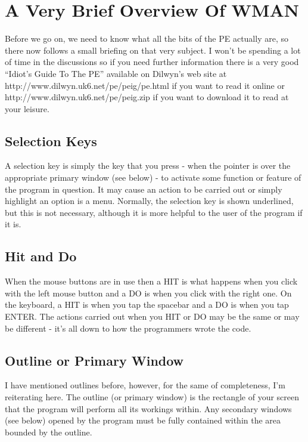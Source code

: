 \section{A Very Brief Overview Of WMAN}
\label{ch22-overview}%

Before we go on, we need to know what all the bits of the PE
    actually are, so there now follows a small briefing on that very subject.
    I won't be spending a lot of time in the discussions so if you need
    further information there is a very good ``Idiot's Guide To The PE''
    available on Dilwyn's web site at
    http://www.dilwyn.uk6.net/pe/peig/pe.html if you want to read it online or
    http://www.dilwyn.uk6.net/pe/peig.zip if you want to download it to read
    at your leisure.

\subsection{Selection Keys}
\label{ch22-sel-keys}%

A selection key is simply the key that you press -{} when the
      pointer is over the appropriate primary window (see below) -{} to activate
      some function or feature of the program in question. It may cause an
      action to be carried out or simply highlight an option is a menu.
      Normally, the selection key is shown underlined, but this is not
      necessary, although it is more helpful to the user of the program if it
      is.

\subsection{Hit and Do}
\label{ch22-hit-do}%

When the mouse buttons are in use then a HIT is what happens when
      you click with the left mouse button and a DO is when you click with the
      right one. On the keyboard, a HIT is when you tap the spacebar and a DO
      is when you tap ENTER. The actions carried out when you HIT or DO may be
      the same or may be different -{} it's all down to how the programmers
      wrote the code.

\subsection{Outline or Primary Window}
\label{ch22-outln}%

I have mentioned outlines before, however, for the same of
      completeness, I'm reiterating here. The outline (or primary window) is
      the rectangle of your screen that the program will perform all its
      workings within. Any secondary windows (see below) opened by the program
      must be fully contained within the area bounded by the outline.

